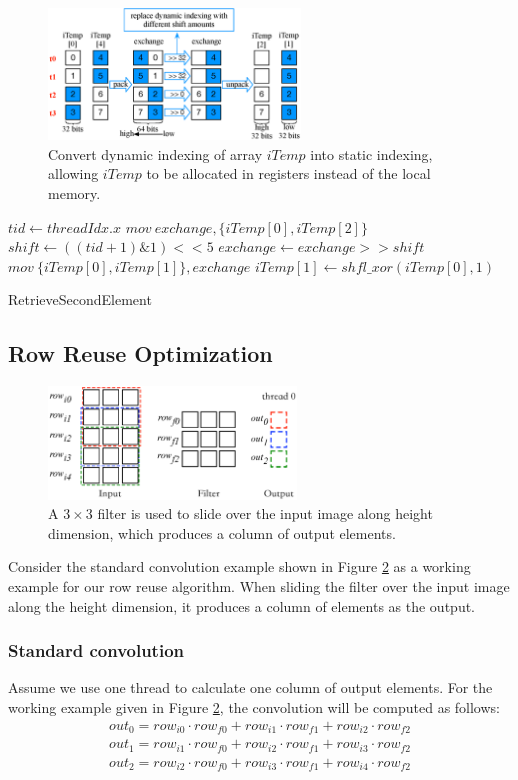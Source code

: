 \begin{figure}[t!]
	\centering
	\includegraphics[width=0.8\columnwidth,height=3.5cm]{./figure/exchange.eps}
\caption{Convert dynamic indexing of array $iTemp$ into static indexing, allowing  $iTemp$ to be allocated in registers instead of the local memory.}
\label{fig:exchange}
\end{figure}

\begin{algorithm}[t!]
\small
	$tid \gets threadIdx.x$\;
	$mov\ exchange, \{iTemp[0], iTemp[2]\}$\;
	$shift \gets ((tid+1)\&1)<<5$\;
	$exchange \gets exchange >> shift$\;
	$mov\ \{iTemp[0],iTemp[1]\}, exchange$\;
	$iTemp[1] \gets shfl\_xor(iTemp[0],1)$\;	
	\caption{RetrieveSecondElement}
	\label{algo:basic2}
\end{algorithm}


\subsection{Row Reuse Optimization}
\label{sec:rowreuse}
\begin{figure}[t!]
	\centering
	\includegraphics[width=0.8\columnwidth,height=3cm]{./figure/rowreuse.eps}
\caption{A $3 \times 3$ filter is used to slide over the input image along height dimension, which produces a column of output elements.}
\label{fig:rowreuse}
\end{figure}

 Consider the standard convolution example shown in Figure \ref{fig:rowreuse} as a working example for our row reuse algorithm.
When sliding the filter over the input image along the height dimension, it produces a column of elements as the output.

\subsubsection{Standard convolution} Assume we use one thread to calculate one column of output elements.
For the working example given in Figure \ref{fig:rowreuse}, the convolution will be computed as follows:
\begin{gather*}
  out_0=row_{i0} \cdot row_{f0} + row_{i1} \cdot row_{f1} + row_{i2} \cdot row_{f2} \\
out_{1}=row_{i1} \cdot row_{f0} + row_{i2} \cdot row_{f1} + row_{i3} \cdot row_{f2} \\
out_{2}=row_{i2} \cdot row_{f0} + row_{i3} \cdot row_{f1} + row_{i4} \cdot row_{f2}
\end{gather*}

